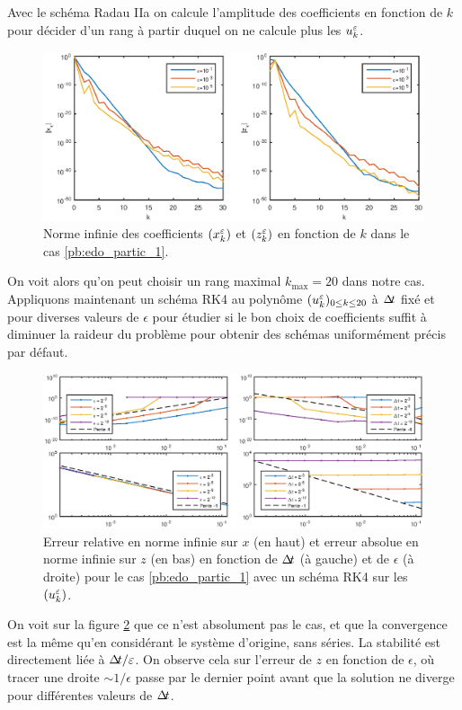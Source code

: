Avec le schéma Radau IIa on calcule l'amplitude des coefficients en fonction de $k$ pour décider d'un rang à partir duquel on ne calcule plus les $u_k^{\varepsilon}$. 
\begin{figure}[!h]
\centering
\includegraphics[width=1\textwidth]{img/chap3/norm_coeffs_series.eps}
\caption{Norme infinie des coefficients $(x_k^{\varepsilon})$ et $(z_k^{\varepsilon})$ en fonction de $k$ dans le cas \eqref{pb:edo_partic_1}.}
\label{fig:norm_coeffs_series}
\end{figure}
On voit alors qu'on peut choisir un rang maximal $k_{\max} = 20$ dans notre cas. Appliquons maintenant un schéma RK4 au polynôme $(u_k^{\varepsilon})_{0\leq k\leq 20}$ à $\Delta\!\!\!\ t$ fixé et pour diverses valeurs de $\epsilon$ pour étudier si le bon choix de coefficients suffit à diminuer la raideur du problème pour obtenir des schémas uniformément précis par défaut. 
\begin{figure}[!h]
\centering 
\includegraphics[width=\textwidth]{img/chap3/conv_rk4_series.eps}
\caption{Erreur relative en norme infinie sur $x$ (en haut) et erreur absolue en norme infinie sur $z$ (en bas) en fonction de $\Delta\!\!\!\ t$ (à gauche) et de $\epsilon$ (à droite) pour le cas \eqref{pb:edo_partic_1} avec un schéma RK4 sur les $(u_k^{\varepsilon})$.}
\label{fig:conv_series_cas1}
\end{figure}
On voit sur la figure \ref{fig:conv_series_cas1} que ce n'est absolument pas le cas, et que la convergence est la même qu'en considérant le système d'origine, sans séries. 
La stabilité est directement liée à $\Delta\!\!\!\ t/\varepsilon$. 
On observe cela sur l'erreur de $z$ en fonction de $\epsilon$, où tracer une droite $\sim 1/\epsilon$ passe par le dernier point avant que la solution ne diverge pour différentes valeurs de $\Delta\!\!\!\ t$. 


